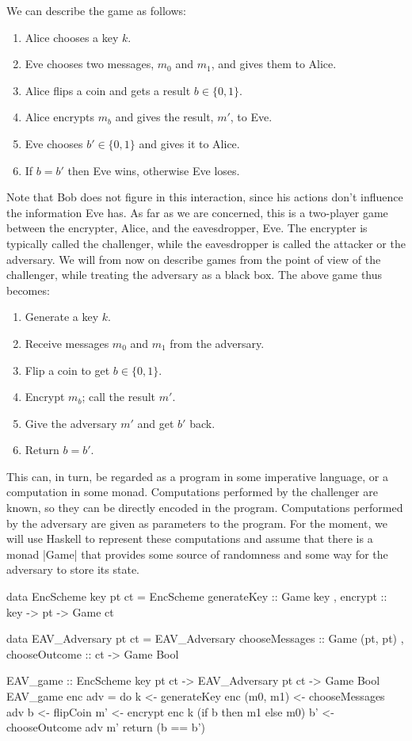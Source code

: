 We can describe the game as follows:
\begin{enumerate}
    \itemsep0em
    \item Alice chooses a key $k$.
    \item Eve chooses two messages, $m_0$ and $m_1$, and gives them to Alice.
    \item Alice flips a coin and gets a result $b \in \{0, 1\}$.
    \item Alice encrypts $m_b$ and gives the result, $m'$, to Eve.
    \item Eve chooses $b' \in \{0, 1\}$ and gives it to Alice.
    \item If $b = b'$ then Eve wins, otherwise Eve loses.
\end{enumerate}

Note that Bob does not figure in this interaction, since his actions don't influence the information Eve has.  As far as
we are concerned, this is a two-player game between the encrypter, Alice, and the eavesdropper, Eve.  The encrypter is
typically called the challenger, while the eavesdropper is called the attacker or the adversary.  We will from now on
describe games from the point of view of the challenger, while treating the adversary as a black box.  The above game
thus becomes:
\begin{enumerate}
    \itemsep0em
    \item Generate a key $k$.
    \item Receive messages $m_0$ and $m_1$ from the adversary.
    \item Flip a coin to get $b \in \{0, 1\}$.
    \item Encrypt $m_b$; call the result $m'$.
    \item Give the adversary $m'$ and get $b'$ back.
    \item Return $b = b'$.
\end{enumerate}

This can, in turn, be regarded as a program in some imperative language, or a computation in some monad.  Computations
performed by the challenger are known, so they can be directly encoded in the program.  Computations performed by the
adversary are given as parameters to the program.  For the moment, we will use Haskell to represent these computations
and assume that there is a monad |Game| that provides some source of randomness and some way for the adversary to
store its state.
\begin{code}
data EncScheme key pt ct  = EncScheme
                          { generateKey :: Game key
                          , encrypt :: key -> pt -> Game ct
                          }

data EAV_Adversary pt ct  = EAV_Adversary
                          { chooseMessages :: Game (pt, pt)
                          , chooseOutcome :: ct -> Game Bool
                          }

EAV_game :: EncScheme key pt ct -> EAV_Adversary pt ct -> Game Bool
EAV_game enc adv = do
    k <- generateKey enc
    (m0, m1) <- chooseMessages adv
    b <- flipCoin
    m' <- encrypt enc k (if b then m1 else m0)
    b' <- chooseOutcome adv m'
    return (b == b')
\end{code}

